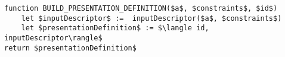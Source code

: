 
\begin{lstlisting}[language=pseudo, caption={Relação de um verificador $R^v$: Função para construir definição de apresentação.}]
function BUILD_PRESENTATION_DEFINITION($a$, $constraints$, $id$)
    let $inputDescriptor$ :=  inputDescriptor($a$, $constraints$)
    let $presentationDefinition$ := $\langle id, inputDescriptor\rangle$
return $presentationDefinition$
\end{lstlisting}

